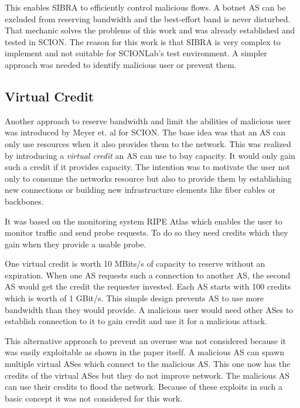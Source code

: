 \documentclass[thesis.tex]{subfiles}
\begin{document}
This enables SIBRA to efficiently control malicious flows. A botnet AS can be excluded from reserving bandwidth and the best-effort band is never disturbed. That mechanic solves the problems of this work and was already established and tested in SCION. The reason for this work is that SIBRA is very complex to implement and not suitable for SCIONLab's test environment. A simpler approach was needed to identify malicious user or prevent them.

\subsection{Virtual Credit} \cite{Meyer.2017}
Another approach to reserve bandwidth and limit the abilities of malicious user was introduced by Meyer et. al for SCION. The base idea was that an AS can only use resources when it also provides them to the network. This was realized by introducing a \textit{virtual credit} an AS can use to buy capacity. It would only gain such a credit if it provides capacity. The intention was to motivate the user not only to consume the networks resource but also to provide them by establishing new connections or building new infrastructure elements like fiber cables or backbones.

It was based on the monitoring system RIPE Atlas \cite{Ripenetworkcoordinationcentre.19.04.2018} which enables the user to monitor traffic and send probe requests. To do so they need credits which they gain when they provide a usable probe.

One virtual credit is worth 10 MBits/s of capacity to reserve without an expiration. When one AS requests such a connection to another AS, the second AS would get the credit the requester invested. Each AS starts with 100 credits which is worth of 1 GBit/s. This simple design prevents AS to use more bandwidth than they would provide. A malicious user would need other ASes to establish connection to it to gain credit and use it for a malicious attack.

This alternative approach to prevent an overuse was not considered because it was easily exploitable as shown in the paper itself. A malicious AS can spawn multiple virtual ASes which connect to the malicious AS. This one now has the credits of the virtual ASes but they do not improve network. The malicious AS can use their credits to flood the network. Because of these exploits in such a basic concept it was not considered for this work.
\end{document}
